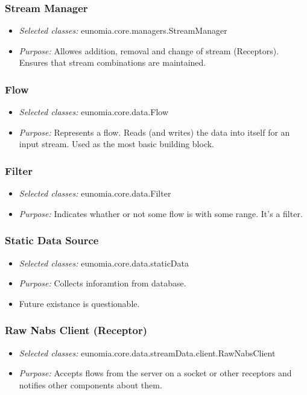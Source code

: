 \documentclass[titlepage,12pt]{article}
\begin{document}
\subsubsection{Stream Manager}
\begin{itemize}
\item \emph{Selected classes:} eunomia.core.managers.StreamManager
\item \emph{Purpose:} Allowes addition, removal and change of stream (Receptors). Ensures that stream combinations are maintained.
\end{itemize}

\subsubsection{Flow}
\begin{itemize}
\item \emph{Selected classes:} eunomia.core.data.Flow
\item \emph{Purpose:} Represents a flow. Reads (and writes) the data into itself for an input stream. Used as the most basic building block.
\end{itemize}

\subsubsection{Filter}
\begin{itemize}
\item \emph{Selected classes:} eunomia.core.data.Filter
\item \emph{Purpose:} Indicates whather or not some flow is with some range. It's a filter.
\end{itemize}

\subsubsection{Static Data Source}
\begin{itemize}
\item \emph{Selected classes:} eunomia.core.data.staticData
\item \emph{Purpose:} Collects inforamtion from database.
\item Future existance is questionable.
\end{itemize}

\subsubsection{Raw Nabs Client (Receptor)}
\begin{itemize}
\item \emph{Selected classes:} eunomia.core.data.streamData.client.RawNabsClient
\item \emph{Purpose:} Accepts flows from the server on a socket or other receptors and notifies other components about them.
\end{itemize}
\end{document}
